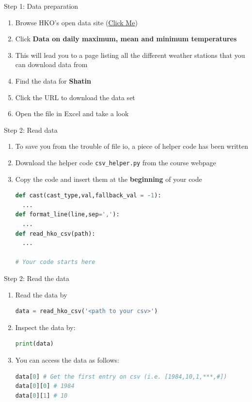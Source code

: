 \documentclass[10pt,xcolor={table,dvipsnames},t]{beamer}
\begin{document}
\begin{frame}{Step 1: Data preparation}
  \begin{enumerate}
    \item Browse HKO's open data site (\href{https://www.hko.gov.hk/en/abouthko/opendata_intro.htm}{Click Me})
    \item Click \textbf{Data on daily maximum, mean and minimum temperatures}
    \item This will lead you to a page listing all the different weather stations that you can download data from
    \item Find the data for \textbf{Shatin}
    \item Click the URL to download the data set
    \item Open the file in Excel and take a look
  \end{enumerate}
\end{frame}

\begin{frame}[fragile]{Step 2: Read data}
  \begin{enumerate}
    \item To save you from the trouble of file io, a piece of helper code has been written
    \item Download the helper code \texttt{csv\_helper.py} from the course webpage
    \item Copy the code and insert them at the \textbf{beginning} of your code
\begin{lstlisting}[language=python]
def cast(cast_type,val,fallback_val = -1):
  ...
def format_line(line,sep=','):
  ...
def read_hko_csv(path):
  ... 

# Your code starts here
\end{lstlisting}
  \end{enumerate}
\end{frame}

\begin{frame}[fragile]{Step 2: Read the data}
  \begin{enumerate}
    \item Read the data by 
\begin{lstlisting}[language=python]
data = read_hko_csv('<path to your csv>')
\end{lstlisting}
    \item Inspect the data by:
\begin{lstlisting}[language=python]
print(data)
\end{lstlisting}
    \item You can access the data as follows:
\begin{lstlisting}[language=python]
data[0] # Get the first entry on csv (i.e. [1984,10,1,***,#]) 
data[0][0] # 1984
data[0][1] # 10
\end{lstlisting}
  \end{enumerate}
\end{frame}
\end{document}
